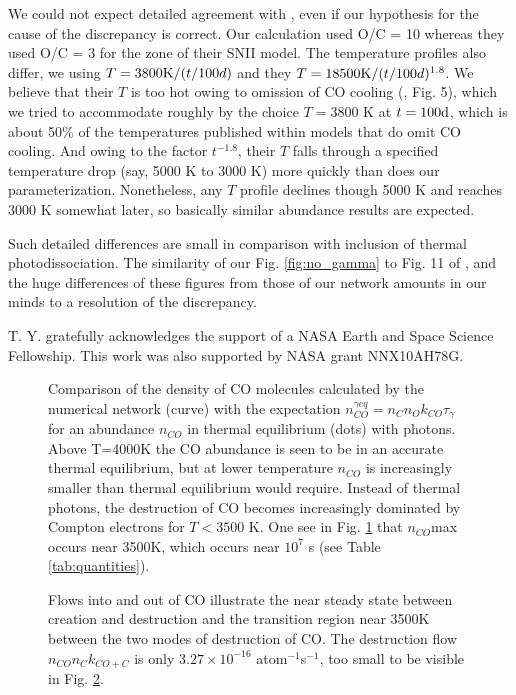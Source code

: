 \documentclass[manuscript]{aastex}
\newcommand{\ncogeq}{n_{CO}^{\gamma eq}}
\begin{document}
We could not expect detailed agreement with \citet{2009ApJ...703..642C},
even if our hypothesis for the
cause of the discrepancy is correct. Our calculation used
O/C = 10 whereas they used O/C = 3 for the zone of their SNII model.
The temperature profiles also differ, we using $T=3800 {\rm K}/(t/100d)$
and they $T=18500 {\rm K}/(t/100d)^{1.8}$.
We believe that their $T$ is too hot owing to omission of CO cooling
(\citealp{1996ApJ...471..480L}, Fig. 5),
which we tried to accommodate roughly by
the choice $T=3800$ K at $t=100 {\rm d}$,
which is about 50\% of the temperatures
published within models that do omit CO cooling. And owing to the
factor $t^{-1.8}$, their $T$ falls through a specified temperature drop
(say, 5000 K to 3000 K) more quickly than does our parameterization.
Nonetheless, any $T$ profile declines though 5000 K and reaches 3000 K
somewhat later, so basically similar abundance results are expected. 

Such detailed differences are small in comparison with inclusion of
thermal photodissociation. The similarity of our Fig. \ref{fig:no_gamma}
to Fig. 11 of \citet{2009ApJ...703..642C},
and the huge differences of these figures from those of our network
amounts in our minds to a resolution of the discrepancy. 

\acknowledgments

T. Y. gratefully acknowledges the support of
a NASA Earth and Space Science Fellowship.
This work was also supported by NASA grant NNX10AH78G.

\clearpage

\begin{figure}
\caption{
Comparison of the density of CO molecules calculated by the numerical
network (curve) with the expectation $\ncogeq = n_C n_O k_{CO} \tau_\gamma$
for an abundance
$n_{CO}$ in thermal equilibrium (dots) with photons.
Above T=4000K the CO abundance is seen to be in an accurate thermal
equilibrium, but at lower temperature $n_{CO}$ is increasingly smaller than
thermal equilibrium would require. Instead of thermal photons,
the destruction of CO becomes increasingly dominated by
Compton electrons for $T < 3500$ K.
One see in Fig. \ref{fig:nco} that $n_{CO}$max occurs near 3500K,
which occurs near $10^7$ s (see Table \ref{tab:quantities}).} 
\label{fig:nco}
\end{figure}

\clearpage

\begin{figure}
\caption{
Flows into and out of CO illustrate the near steady state between creation
and destruction and the transition region near 3500K between the two modes
of destruction of CO.
The destruction flow $n_{CO} n_C k_{CO+C}$ is only $3.27 \times
10^{-16}$ atom$^{-1}$s$^{-1}$, too small to be visible in Fig. \ref{fig:flows}. 
} \label{fig:flows}
\end{figure}
\end{document}

